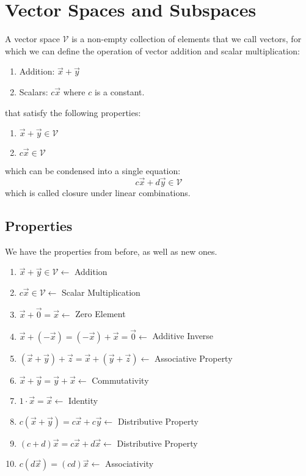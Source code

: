 \section{Vector Spaces and Subspaces}
A vector space $\mathcal{V}$ is a non-empty collection of elements that we call vectors, for which we can define the operation of vector addition and scalar multiplication:
    \begin{enumerate}
    \item Addition: $\vec{x} + \vec{y}$
    \item Scalars: $c \vec{x}$ where $c$ is a constant.
    \end{enumerate}
that satisfy the following properties:
    \begin{enumerate}
    \item $\vec{x} + \vec{y} \in \mathcal{V}$
    \item $c \vec{x} \in \mathcal{V}$
    \end{enumerate}

which can be condensed into a single equation:
\[
    c\vec{x} + d\vec{y} \in \mathcal{V}
\]
which is called closure under linear combinations.

    \subsection{Properties}
    We have the properties from before, as well as new ones.

    \begin{enumerate}
    \item $\vec{x} + \vec{y} \in \mathcal{V} \leftarrow $ Addition
    \item $c \vec{x} \in \mathcal{V} \leftarrow $ Scalar Multiplication
    \item $\vec{x} + \vec{0} = \vec{x} \leftarrow $ Zero Element
    \item $\vec{x} + (-\vec{x}) = (-\vec{x}) + \vec{x} = \vec{0} \leftarrow $ Additive Inverse
    \item $(\vec{x} + \vec{y}) + \vec{z} = \vec{x} + (\vec{y} + \vec{z}) \leftarrow$ Associative Property
    \item $\vec{x} + \vec{y} = \vec{y} + \vec{x} \leftarrow $ Commutativity
    \item $1 \cdot \vec{x} = \vec{x} \leftarrow$ Identity
    \item $c (\vec{x} + \vec{y}) = c\vec{x} + c\vec{y} \leftarrow $ Distributive Property
    \item $(c + d) \vec{x} = c\vec{x} + d\vec{x} \leftarrow $ Distributive Property
    \item $c(d\vec{x}) = (cd)\vec{x} \leftarrow $ Associativity
    \end{enumerate}

